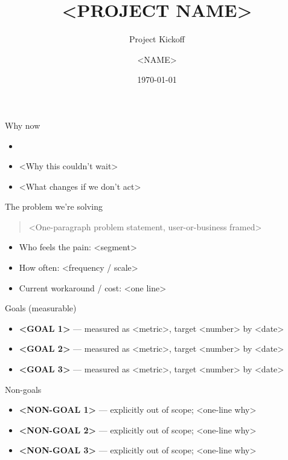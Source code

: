 \documentclass[aspectratio=169,12pt]{beamer}
\title{<PROJECT NAME>}
\subtitle{Project Kickoff}
\author{<NAME>}
\institute{Sponsor: <SPONSOR-NAME>}
\date{\today}
\begin{document}
\begin{frame}[plain]
  \titlepage
\end{frame}

\begin{frame}{Why now}
  \begin{itemize}
    \item <The trigger --- a deadline, an incident, a regulation, an opportunity>
    \item <Why this couldn't wait>
    \item <What changes if we don't act>
  \end{itemize}
\end{frame}

\begin{frame}{The problem we're solving}
  \begin{quote}
    <One-paragraph problem statement, user-or-business framed>
  \end{quote}
  \begin{itemize}
    \item Who feels the pain: <segment>
    \item How often: <frequency / scale>
    \item Current workaround / cost: <one line>
  \end{itemize}
\end{frame}

\begin{frame}{Goals (measurable)}
  \begin{itemize}
    \item \textbf{<GOAL 1>} --- measured as <metric>, target <number> by <date>
    \item \textbf{<GOAL 2>} --- measured as <metric>, target <number> by <date>
    \item \textbf{<GOAL 3>} --- measured as <metric>, target <number> by <date>
  \end{itemize}
\end{frame}

\begin{frame}{Non-goals}
  \begin{itemize}
    \item \textbf{<NON-GOAL 1>} --- explicitly out of scope; <one-line why>
    \item \textbf{<NON-GOAL 2>} --- explicitly out of scope; <one-line why>
    \item \textbf{<NON-GOAL 3>} --- explicitly out of scope; <one-line why>
  \end{itemize}
\end{frame}
\end{document}

